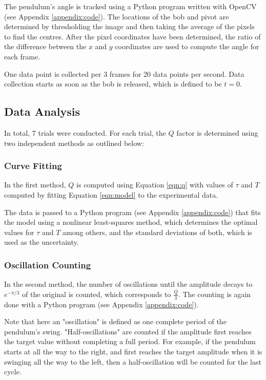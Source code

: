 \documentclass[aps,twocolumn,secnumarabic,nobalancelastpage,amsmath,amssymb,nofootinbib,letterpaper]{revtex4}
\begin{document}
The pendulum's angle is tracked using a Python program written with OpenCV (see Appendix \ref{appendix:code}).
The locations of the bob and pivot are determined by thresholding the image and then taking the average of the pixels to
find the centres. After the pixel coordinates have been determined, the ratio of the difference between the \(x\) and
\(y\) coordinates are used to compute the angle for each frame.

One data point is collected per 3 frames for 20 data points per second. Data collection starts as soon as the bob is
released, which is defined to be \(t = 0\).

\subsection{Data Analysis}

In total, 7 trials were conducted.
For each trial, the \(Q\) factor is determined using two independent methods as outlined below:

\subsubsection{Curve Fitting}

In the first method, \(Q\) is computed using Equation \ref{eqn:q} with values of \(\tau\) and \(T\) computed by fitting
Equation \ref{eqn:model} to the experimental data.

The data is passed to a Python program (see Appendix \ref{appendix:code}) that fits the model using a nonlinear
least-squares method, which determines the optimal values for \(\tau\) and \(T\) among others, and the standard
deviations of both, which is used as the uncertainty.

\subsubsection{Oscillation Counting}
\label{section:method:oscillation}

In the second method, the number of oscillations until the amplitude decays to \(e^{-\pi/3}\) of the original is
counted, which corresponds to \(\frac{Q}{3}\). The counting is again done with a Python program (see Appendix
\ref{appendix:code}).

Note that here an "oscillation" is defined as one complete period of the pendulum's swing. "Half-oscillations" are
counted if the amplitude first reaches the target value without completing a full period. For example, if the pendulum
starts at all the way to the right, and first reaches the target amplitude when it is swinging all the way to the left,
then a half-oscillation will be counted for the last cycle.
\end{document}
